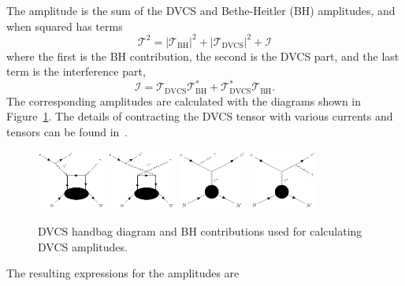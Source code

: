 The amplitude is the sum of the DVCS and Bethe-Heitler (BH) amplitudes, and 
when squared has terms
\begin{equation}
   \mathcal{T}^2 = \left|\mathcal{T}_{\text{BH}}\right|^2 + 
   \left|\mathcal{T}_{\text{DVCS}}\right|^2 + \mathcal{I}
\end{equation}
where the first is the BH contribution, the second is the DVCS part, and the last 
term is the interference part,
\begin{equation}
   \mathcal{I} = \mathcal{T}_{\text{DVCS}}\mathcal{T}_{\text{BH}}^{*} + 
   \mathcal{T}_{\text{DVCS}}^{*}\mathcal{T}_{\text{BH}}.
\end{equation}
The corresponding amplitudes are calculated with the diagrams shown in 
Figure~\ref{fig:DVCShandbag}. The details of contracting the DVCS tensor with 
various currents and tensors can be found in~\cite{Kirchner:2003wt}.
\begin{figure}[!hbt]
   \centering
   \includegraphics[width=0.20\textwidth]{figures/dvcs_feynman-figure1.pdf}
   \includegraphics[width=0.20\textwidth]{figures/dvcs_feynman-figure2.pdf}
   \includegraphics[width=0.20\textwidth]{figures/dvcs_feynman-figure3.pdf}
   \includegraphics[width=0.20\textwidth]{figures/dvcs_feynman-figure4.pdf}
   \caption{\label{fig:DVCShandbag}DVCS handbag diagram and BH contributions 
   used for calculating DVCS amplitudes.}
\end{figure}
%
The resulting expressions for the amplitudes are

